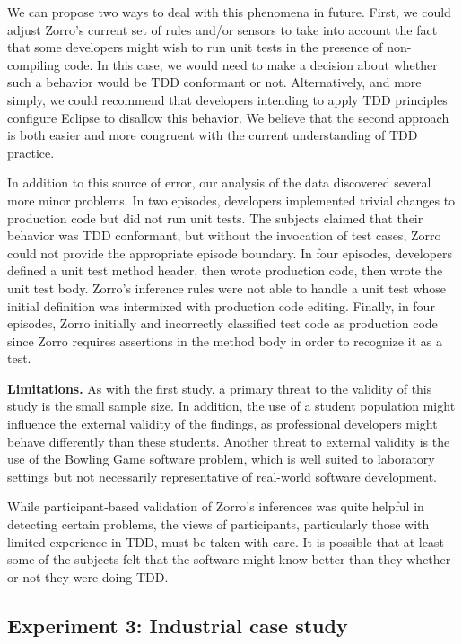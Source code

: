 \documentclass[smallextended]{svjour3}     %
\begin{document}
We can propose two ways to deal with this phenomena in future.  First, we
could adjust Zorro's current set of rules and/or sensors to take into
account the fact that some developers might wish to run unit tests in the
presence of non-compiling code. In this case, we would need to make a
decision about whether such a behavior would be TDD conformant or not.
Alternatively, and more simply, we could recommend that developers
intending to apply TDD principles configure Eclipse to disallow this
behavior.  We believe that the second approach is both easier and more
congruent with the current understanding of TDD practice.

In addition to this source of error, our analysis of the data discovered
several more minor problems. In two episodes, developers implemented trivial
changes to production code but did not run unit tests. The subjects claimed
that their behavior was TDD conformant, but without the invocation of test
cases, Zorro could not provide the appropriate episode boundary.  In four
episodes, developers defined a unit test method header, then wrote
production code, then wrote the unit test body.  Zorro's inference rules
were not able to handle a unit test whose initial definition was intermixed
with production code editing. Finally, in four episodes, Zorro initially
and incorrectly classified test code as production code since Zorro
requires assertions in the method body in order to recognize it as a test. 

{\bf Limitations.}  As with the first study, a primary threat to the
validity of this study is the small sample size.  In addition, the use of a
student population might influence the external validity of the findings,
as professional developers might behave differently than these students.
Another threat to external validity is the use of the Bowling Game
software problem, which is well suited to laboratory settings but not
necessarily representative of real-world software development. 

While participant-based validation of Zorro's inferences was quite helpful
in detecting certain problems, the views of participants, particularly
those with limited experience in TDD, must be taken with care.  It is
possible that at least some of the subjects felt that the software might
know better than they whether or not they were doing TDD.  


\subsection{Experiment 3: Industrial case study}
\end{document}
